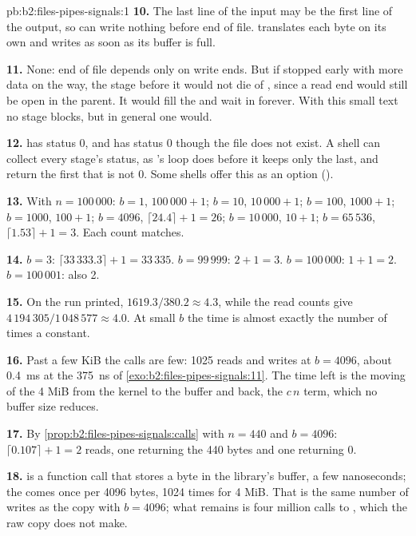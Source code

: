 \begin{solution}{pb:b2:files-pipes-signals:1}
\textbf{10.} The last line of the input may be the first line of the output, so  can write nothing before
end of file.  translates each byte on its own and writes as soon as its buffer is full.

\textbf{11.} None: end of file depends only on write ends. But if  stopped early with more data on the
way, the stage before it would not die of , since a read end would still be open in the parent. It
would fill the  and wait in  forever. With this small text no stage blocks, but in general one would.

\textbf{12.}  has status 0, and  has status 0 though the file
does not exist. A shell can collect every stage's status, as 's loop does before it keeps only the
last, and return the first that is not 0. Some shells offer this as an option ().

\textbf{13.} With $n = 100\,000$: $b = 1$, $100\,000 + 1$; $b = 10$, $10\,000 + 1$; $b = 100$, $1000 + 1$;
$b = 1000$, $100 + 1$; $b = 4096$, $\lceil 24.4 \rceil + 1 = 26$; $b = 10\,000$, $10 + 1$; $b = 65\,536$,
$\lceil 1.53 \rceil + 1 = 3$. Each count matches.

\textbf{14.} $b = 3$: $\lceil 33\,333.3 \rceil + 1 = 33\,335$. $b = 99\,999$: $2 + 1 = 3$. $b = 100\,000$:
$1 + 1 = 2$. $b = 100\,001$: also 2.

\textbf{15.} On the run printed, $1619.3 / 380.2 \approx 4.3$, while the read counts give
$4\,194\,305 / 1\,048\,577 \approx 4.0$. At small $b$ the time is almost exactly the number of  times a
constant.

\textbf{16.} Past a few KiB the calls are few: 1025 reads and writes at $b = 4096$, about 0.4~ms at the 375~ns of
\cref{exo:b2:files-pipes-signals:11}. The time left is the moving of the 4 MiB from the kernel to the buffer and back,
the $c\,n$ term, which no buffer size reduces.

\textbf{17.} By \cref{prop:b2:files-pipes-signals:calls} with $n = 440$ and $b = 4096$: $\lceil 0.107 \rceil + 1 = 2$
reads, one returning the 440 bytes and one returning 0.

\textbf{18.}  is a function call that stores a byte in the library's buffer, a few nanoseconds; the  comes once per 4096 bytes, 1024 times for 4 MiB. That is the same number of writes as the copy with
$b = 4096$; what remains is four million calls to , which the raw copy does not make.


\end{solution}
